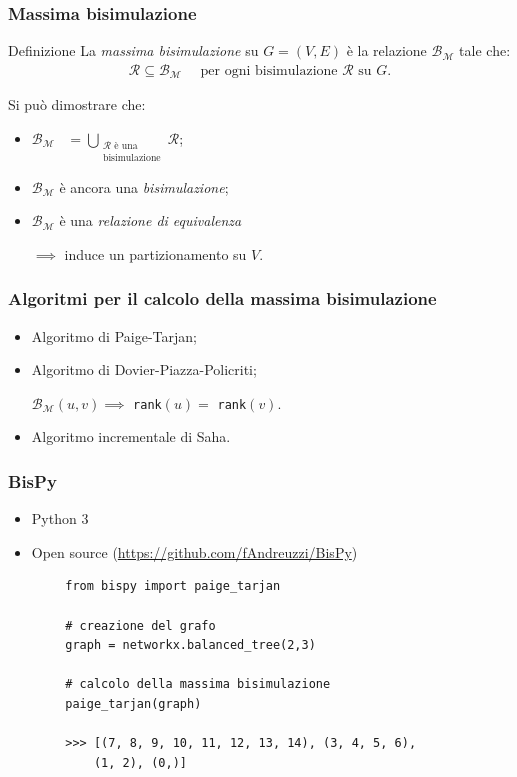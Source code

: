 \documentclass{beamer}
\begin{document}
\begin{frame}\frametitle{Massima bisimulazione}
    \begin{block}{Definizione}
        La \emph{massima bisimulazione} su $G = (V,E)$ è la relazione $\mathcal{B}_\mathcal{M}$ tale che:
        \begin{gather*}
            \mathcal{R} \subseteq \mathcal{B}_\mathcal{M} \quad \text{ per ogni bisimulazione } \mathcal{R} \text{ su } G.
        \end{gather*}
    \end{block}

    \bigskip\bigskip

    Si può dimostrare che:
    \begin{itemize}
        \item $\displaystyle \mathcal{B}_\mathcal{M} \,\,\,\,\,= \bigcup_{\substack{\mathcal{R} \text{ è una}\\\text{bisimulazione}}} \mathcal{R}$;
        \item $\mathcal{B}_\mathcal{M}$ è ancora una \emph{bisimulazione};
        \item $\mathcal{B}_\mathcal{M}$ è una \emph{relazione di equivalenza}

        $\implies$ induce un partizionamento su $V$.
    \end{itemize}
\end{frame}

\begin{frame}\frametitle{Algoritmi per il calcolo della massima bisimulazione}
    \begin{itemize}
        \item Algoritmo di Paige-Tarjan;
        \item Algoritmo di Dovier-Piazza-Policriti;

        \qquad $\mathcal{B}_\mathcal{M}(u,v) \implies$ \texttt{rank}$(u) =$ \texttt{rank}$(v)$.
        \item Algoritmo incrementale di Saha.
    \end{itemize}
\end{frame}

\begin{frame}[fragile]\frametitle{BisPy}
    \begin{itemize}
        \item Python 3
        \item Open source (\url{https://github.com/fAndreuzzi/BisPy})
    \end{itemize}


    \begin{example}
        \begin{verbatim}
        from bispy import paige_tarjan

        # creazione del grafo
        graph = networkx.balanced_tree(2,3)

        # calcolo della massima bisimulazione
        paige_tarjan(graph)

        >>> [(7, 8, 9, 10, 11, 12, 13, 14), (3, 4, 5, 6),
            (1, 2), (0,)]
        \end{verbatim}
    \end{example}
\end{frame}
\end{document}
